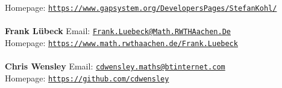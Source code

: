 \documentclass[a4paper,11pt]{report}
\begin{document}
\begin{titlepage}
{  Homepage: \href{https://www.gap-system.org/DevelopersPages/StefanKohl/} {\texttt{https://www.gap\texttt{}system.org/DevelopersPages/StefanKohl/}}}\\
{\mbox{}\\
\small \noindent \textbf{ Frank L{\"u}beck   }  Email: \href{mailto://Frank.Luebeck@Math.RWTH-Aachen.De} {\texttt{Frank.Luebeck@Math.RWTH\texttt{}Aachen.De}}\\
  Homepage: \href{https://www.math.rwth-aachen.de/~Frank.Luebeck} {\texttt{https://www.math.rwth\texttt{}aachen.de/\texttt{}Frank.Luebeck}}}\\
{\mbox{}\\
\small \noindent \textbf{ Chris Wensley   }  Email: \href{mailto://cdwensley.maths@btinternet.com} {\texttt{cdwensley.maths@btinternet.com}}\\
  Homepage: \href{https://github.com/cdwensley} {\texttt{https://github.com/cdwensley}}}\\
\end{titlepage}
\end{document}
